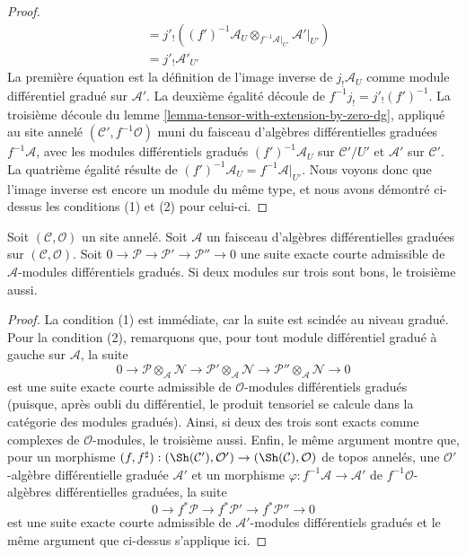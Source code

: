 \begin{proof}
\begin{align*}
& =
j'_!\left(
(f')^{-1}\mathcal{A}_U \otimes_{f^{-1}\mathcal{A}|_{U'}}
\mathcal{A}'|_{U'}\right) \\
& =
j'_!\mathcal{A}'_{U'}
\end{align*}
La première équation est la définition de l'image inverse de $j_!\mathcal{A}_U$ comme module différentiel gradué sur $\mathcal{A}'$.
La deuxième égalité découle de $f^{-1}j_! = j'_!(f')^{-1}$.
La troisième découle du lemme \ref{lemma-tensor-with-extension-by-zero-dg}, appliqué au site annelé $(\mathcal{C}', f^{-1}\mathcal{O})$ muni du faisceau d'algèbres différentielles graduées $f^{-1}\mathcal{A}$, avec les modules différentiels gradués $(f')^{-1}\mathcal{A}_U$ sur $\mathcal{C}'/U'$ et $\mathcal{A}'$ sur $\mathcal{C}'$.
La quatrième égalité résulte de $(f')^{-1}\mathcal{A}_U = f^{-1}\mathcal{A}|_{U'}$.
Nous voyons donc que l'image inverse est encore un module du même type, et nous avons démontré ci-dessus les conditions (1) et (2) pour celui-ci.
\end{proof}

\begin{lemma}
\label{lemma-good-admissible-ses}
Soit $(\mathcal{C}, \mathcal{O})$ un site annelé.
Soit $\mathcal{A}$ un faisceau d'algèbres différentielles graduées sur $(\mathcal{C}, \mathcal{O})$.
Soit $0 \to \mathcal{P} \to \mathcal{P}' \to \mathcal{P}'' \to 0$ une suite exacte courte admissible de $\mathcal{A}$-modules différentiels gradués.
Si deux modules sur trois sont bons, le troisième aussi.
\end{lemma}

\begin{proof}
La condition (1) est immédiate, car la suite est scindée au niveau gradué.
Pour la condition (2), remarquons que, pour tout module différentiel gradué à gauche sur $\mathcal{A}$, la suite
$$
0 \to 
\mathcal{P} \otimes_\mathcal{A} \mathcal{N} \to
\mathcal{P}' \otimes_\mathcal{A} \mathcal{N} \to
\mathcal{P}'' \otimes_\mathcal{A} \mathcal{N} \to 0
$$
est une suite exacte courte admissible de $\mathcal{O}$-modules différentiels gradués (puisque, après oubli du différentiel, le produit tensoriel se calcule dans la catégorie des modules gradués).
Ainsi, si deux des trois sont exacts comme complexes de $\mathcal{O}$-modules, le troisième aussi.
Enfin, le même argument montre que, pour un morphisme $(f, f^\sharp) : (\Sh(\mathcal{C}'), \mathcal{O}') \to (\Sh(\mathcal{C}), \mathcal{O})$ de topos annelés, une $\mathcal{O}'$-algèbre différentielle graduée $\mathcal{A}'$ et un morphisme $\varphi : f^{-1}\mathcal{A} \to \mathcal{A}'$ de $f^{-1}\mathcal{O}$-algèbres différentielles graduées, la suite
$$
0 \to f^*\mathcal{P} \to f^*\mathcal{P}' \to f^*\mathcal{P}'' \to 0
$$
est une suite exacte courte admissible de $\mathcal{A}'$-modules différentiels gradués et le même argument que ci-dessus s'applique ici.
\end{proof}

